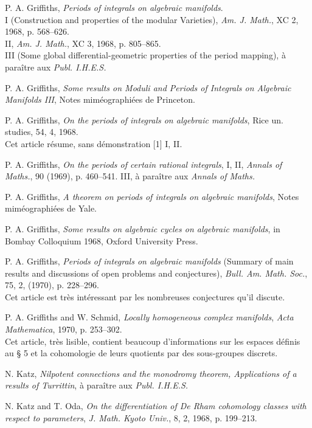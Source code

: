 \documentclass[10pt]{article}
\theoremstyle{deligne}
\begin{document}
\begin{enumerate}[label={[\arabic*]},leftmargin=2.8em]
\item P. A. Griffiths, \emph{Periods of integrals on algebraic manifolds}.\\
I (Construction and properties of the modular Varieties), \emph{Am. J. Math.}, XC 2, 1968, p. 568--626.\\
II, \emph{Am. J. Math.}, XC 3, 1968, p. 805--865.\\
III (Some global differential-geometric properties of the period mapping), à paraître aux \emph{Publ. I.H.E.S.}

\item P. A. Griffiths, \emph{Some results on Moduli and Periods of Integrals on Algebraic Manifolds III}, Notes miméographiées de Princeton.

\item P. A. Griffiths, \emph{On the periods of integrals on algebraic manifolds}, Rice un. studies, 54, 4, 1968.\\
Cet article résume, sans démonstration [1] I, II.

\item P. A. Griffiths, \emph{On the periods of certain rational integrals}, I, II, \emph{Annals of Maths.}, 90 (1969), p. 460--541. III, à paraître aux \emph{Annals of Maths.}

\item P. A. Griffiths, \emph{A theorem on periods of integrals on algebraic manifolds}, Notes miméographiées de Yale.

\item P. A. Griffiths, \emph{Some results on algebraic cycles on algebraic manifolds}, in Bombay Colloquium 1968, Oxford University Press.

\item P. A. Griffiths, \emph{Periods of integrals on algebraic manifolds} (Summary of main results and discussions of open problems and conjectures), \emph{Bull. Am. Math. Soc.}, 75, 2, (1970), p. 228--296.\\
Cet article est très intéressant par les nombreuses conjectures qu'il discute.

\item P. A. Griffiths and W. Schmid, \emph{Locally homogeneous complex manifolds}, \emph{Acta Mathematica}, 1970, p. 253--302.\\
Cet article, très lisible, contient beaucoup d'informations sur les espaces définis au § 5 et la cohomologie de leurs quotients par des sous-groupes discrets.

\item N. Katz, \emph{Nilpotent connections and the monodromy theorem, Applications of a results of Turrittin}, à paraître aux \emph{Publ. I.H.E.S.}

\item N. Katz and T. Oda, \emph{On the differentiation of De Rham cohomology classes with respect to parameters}, \emph{J. Math. Kyoto Univ.}, 8, 2, 1968, p. 199--213.
\end{enumerate}
\end{document}
